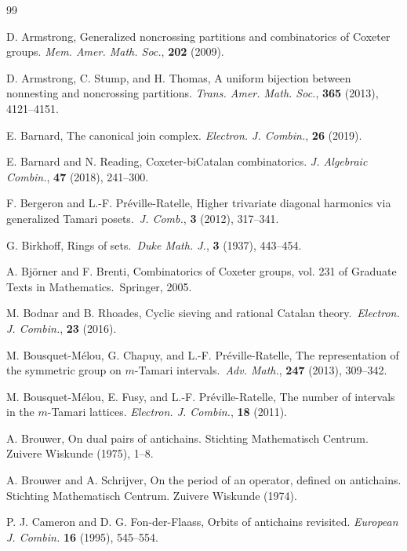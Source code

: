 \documentclass[11pt]{amsart}
\theoremstyle{definition}
\begin{document}
\begin{thebibliography}{99}

D. Armstrong, Generalized noncrossing partitions and combinatorics of Coxeter groups.
\emph{Mem. Amer. Math. Soc.}, {\bf 202} (2009).

D. Armstrong, C. Stump, and H. Thomas, A uniform bijection between nonnesting and noncrossing partitions. \emph{Trans. Amer. Math.
Soc.}, {\bf 365} (2013), 4121--4151.

E. Barnard, The canonical join complex. \emph{Electron. J. Combin.}, {\bf 26} (2019).

E. Barnard and N. Reading, Coxeter-biCatalan combinatorics. \emph{J. Algebraic Combin.}, {\bf 47} (2018), 241--300. 

F. Bergeron and L.-F. Pr\'eville-Ratelle, Higher trivariate diagonal harmonics via generalized Tamari posets.\ \emph{J. Comb.}, {\bf 3} (2012), 317--341. 

G. Birkhoff, Rings of sets.\ \emph{Duke Math. J.}, {\bf 3} (1937), 443--454.  

A. Bj\"orner and F. Brenti, Combinatorics of Coxeter groups, vol. 231 of Graduate Texts in Mathematics.\ Springer, 2005. 

M. Bodnar and B. Rhoades, Cyclic sieving and rational Catalan theory.\ \emph{Electron. J. Combin.}, {\bf 23} (2016). 

M. Bousquet-M\'elou, G. Chapuy, and L.-F. Pr\'eville-Ratelle, The representation of the symmetric group on $m$-Tamari intervals.\ \emph{Adv. Math.}, {\bf 247} (2013), 309--342. 

M. Bousquet-M\'elou, E. Fusy, and L.-F. Pr\'eville-Ratelle, The number of intervals in the $m$-Tamari lattices. \emph{Electron. J. Combin.}, {\bf 18} (2011). 

A. Brouwer, On dual pairs of antichains. Stichting Mathematisch Centrum.
Zuivere Wiskunde (1975), 1--8.

A. Brouwer and A. Schrijver, On the period of an operator, defined on antichains. Stichting Mathematisch Centrum. Zuivere Wiskunde (1974).

P. J. Cameron and D. G. Fon-der-Flaass, Orbits of antichains revisited. \emph{European J. Combin.} {\bf 16} (1995), 545--554.


\end{thebibliography}
\end{document}
